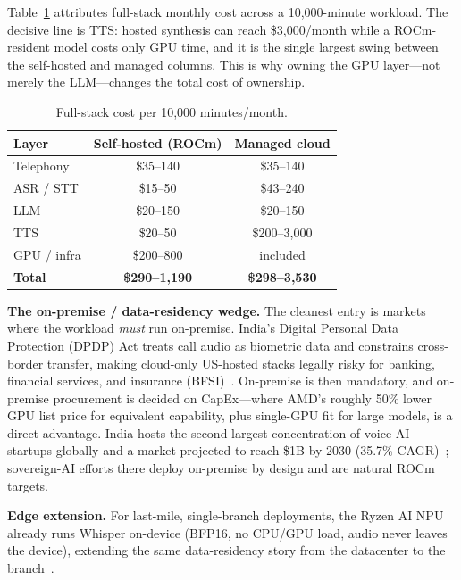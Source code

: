 \documentclass[blind]{gtac}
\begin{document}
Table~\ref{tab:cost} attributes full-stack monthly cost across a 10{,}000-minute workload. The decisive line is TTS: hosted synthesis can reach \$3{,}000/month while a ROCm-resident model costs only GPU time, and it is the single largest swing between the self-hosted and managed columns. This is why owning the GPU layer---not merely the LLM---changes the total cost of ownership.

\begin{table}[t]
\centering
\caption{Full-stack cost per 10{,}000 minutes/month.}
\label{tab:cost}
\footnotesize
\begin{tabular}{@{}lcc@{}}
\toprule
Layer & Self-hosted (ROCm) & Managed cloud \\
\midrule
Telephony & \$35--140 & \$35--140 \\
ASR / STT & \$15--50 & \$43--240 \\
LLM & \$20--150 & \$20--150 \\
TTS & \$20--50 & \$200--3{,}000 \\
GPU / infra & \$200--800 & included \\
\midrule
\textbf{Total} & \textbf{\$290--1{,}190} & \textbf{\$298--3{,}530} \\
\bottomrule
\end{tabular}
\end{table}

\textbf{The on-premise / data-residency wedge.} The cleanest entry is markets where the workload \emph{must} run on-premise. India's Digital Personal Data Protection (DPDP) Act treats call audio as biometric data and constrains cross-border transfer, making cloud-only US-hosted stacks legally risky for banking, financial services, and insurance (BFSI)~\cite{dpdp_checklist,india_guide}. On-premise is then mandatory, and on-premise procurement is decided on CapEx---where AMD's roughly 50\% lower GPU list price for equivalent capability, plus single-GPU fit for large models, is a direct advantage. India hosts the second-largest concentration of voice AI startups globally and a market projected to reach \$1B by 2030 (35.7\% CAGR)~\cite{slator_sarvam,india_guide}; sovereign-AI efforts there deploy on-premise by design and are natural ROCm targets.

\textbf{Edge extension.} For last-mile, single-branch deployments, the Ryzen AI NPU already runs Whisper on-device (BFP16, no CPU/GPU load, audio never leaves the device), extending the same data-residency story from the datacenter to the branch~\cite{amd_ryzen_whisper}.
\end{document}
